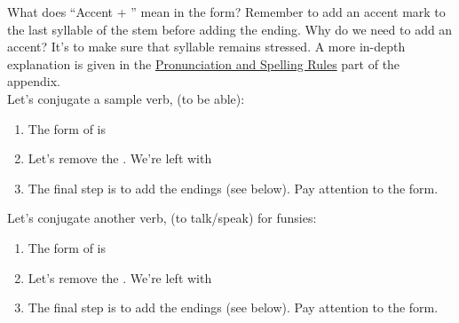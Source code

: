 

What does ``Accent + '' mean in the  form? Remember to add an accent mark to the last syllable of the stem before adding the ending. Why do we need to add an accent? It's to make sure that syllable remains stressed. A more in-depth explanation is given in the \hyperref[subsec:pronun]{Pronunciation and Spelling Rules} part of the appendix. \\

Let's conjugate a sample verb,  (to be able):
\begin{enumerate}[noitemsep]
	\item The  form of  is 
	\item Let's remove the . We're left with 
	\item The final step is to add the endings (see below). Pay attention to the  form. 
\end{enumerate}



Let's conjugate another verb,  (to talk/speak) for funsies: 

\begin{enumerate}[noitemsep]
	\item The  form of  is 
	\item Let's remove the . We're left with 
	\item The final step is to add the endings (see below). Pay attention to the  form. 
\end{enumerate}


